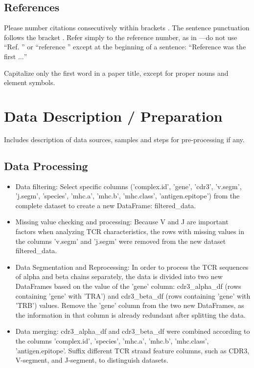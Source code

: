 \documentclass[conference]{IEEEtran}
\begin{document}
	\subsection{References}
	
	Please number citations consecutively within brackets \cite{b1}. The 
	sentence punctuation follows the bracket \cite{b2}. Refer simply to the reference 
	number, as in \cite{b3}---do not use ``Ref. \cite{b3}'' or ``reference \cite{b3}'' except at 
	the beginning of a sentence: ``Reference \cite{b3} was the first $\ldots$''
	
	Capitalize only the first word in a paper title, except for proper nouns and 
	element symbols.
	
	\section{Data Description / Preparation}
	{\color{blue}Includes description of data sources, samples and steps for pre-processing if any.}
	\subsection{Data Processing}
	\begin{itemize}
		\item Data filtering: Select specific columns ('complex.id', 'gene', 'cdr3', 'v.segm', 'j.segm', 'species', 'mhc.a', 'mhc.b', 'mhc.class', 'antigen.epitope') from the complete dataset to create a new DataFrame: filtered\_data.
		\item Missing value checking and processing: Because V and J are important factors when analyzing TCR characteristics, the rows with missing values in the columns 'v.segm' and 'j.segm' were removed from the new dataset filtered\_data.
		\item Data Segmentation and Reprocessing: In order to process the TCR sequences of alpha and beta chains separately, the data is divided into two new DataFrames based on the value of the 'gene' column: cdr3\_alpha\_df (rows containing 'gene' with 'TRA') and cdr3\_beta\_df (rows containing 'gene' with 'TRB') values. Remove the 'gene' column from the two new DataFrames, as the information in that column is already redundant after splitting the data.
		\item Data merging: cdr3\_alpha\_df and cdr3\_beta\_df were combined according to the columns 'complex.id', 'species', 'mhc.a', 'mhc.b', 'mhc.class', 'antigen.epitope'. Suffix different TCR strand feature columns, such as CDR3, V-segment, and J-segment, to distinguish datasets.
		
	\end{itemize}
	
\end{document}
